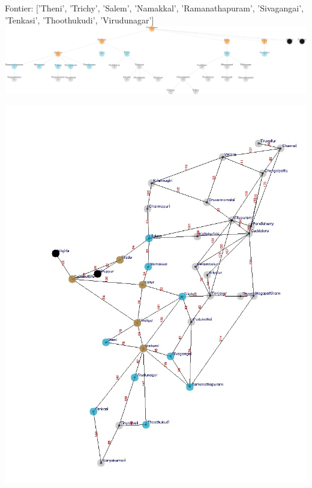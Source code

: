 \documentclass[xcolor=table]{beamer}
\begin{document}
\begin{frame}
  { \tiny Fontier: ['Theni', 'Trichy', 'Salem', 'Namakkal', 'Ramanathapuram', 'Sivagangai', 'Tenkasi', 'Thoothukudi', 'Virudunagar'] }
  \includegraphics[width=1\textwidth]{../BFSNodes/11-1.png}
  \begin{center}
    \includegraphics[height=0.6\textheight]{../BFSoutput/tamilBFS9.jpg}
  \end{center}
\end{frame}
\end{document}
